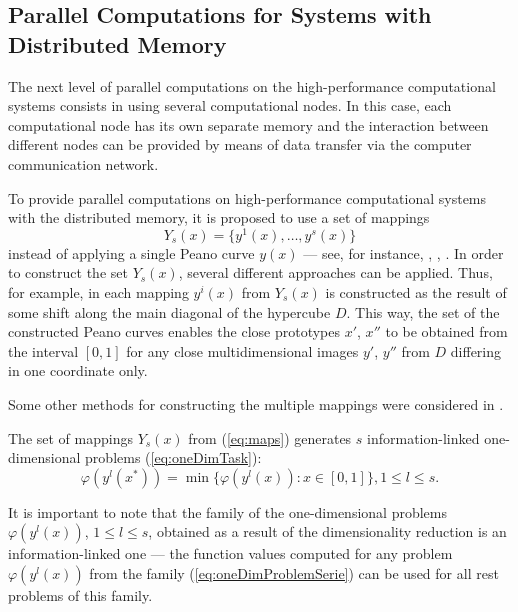 \documentclass{aims}
\theoremstyle{definition}
\begin{document}
\subsection{Parallel Computations for Systems with Distributed Memory}
\label{subsec:distribpar}
The next level of parallel computations on the high-performance computational systems
consists in using several computational nodes. In this case, each computational node has
its own separate memory and the interaction between different nodes can be provided by
means of data transfer via the computer communication network.
\par
To provide parallel computations on high-performance computational systems with the distributed memory, it is proposed to use a set of mappings
\begin{equation}
  \label{eq:maps}
Y_s(x)=\{y^1(x),\dots,y^s(x)\}
\end{equation}
instead of applying a single Peano curve \(y(x)\) --- see, for instance,
\cite{strongin1992}, \cite{stronginGergelBarkalovParGO}, \cite{strSergGO}.
In order to construct the set \(Y_s(x)\), several different approaches can be applied.
Thus, for example, in \cite{strongin1992} each mapping \(y^i(x)\) from \(Y_s(x)\) is constructed
as the result of some shift along the main diagonal of the hypercube \(D\). This way,
the set of the constructed Peano curves enables the close prototypes \(x'\), \(x''\)
to be obtained from the interval \([0, 1]\) for any close multidimensional images
\(y'\), \(y''\) from \(D\) differing in one coordinate only.
\par
Some other methods for constructing the multiple mappings were considered in \cite{stronginGergelBarkalovParGO}.
\par
The set of mappings \(Y_s(x)\) from (\ref{eq:maps}) generates \(s\) information-linked one-\linebreak
dimensional problems (\ref{eq:oneDimTask}):
\begin{equation}
  \label{eq:oneDimProblemSerie}
  \varphi(y^l(x^*))=\min\{\varphi(y^l(x)):x\in [0,1]\},1\leq l\leq s.
\end{equation}
\par
It is important to note that the family of the one-dimensional problems
$\varphi(y^l(x))$, $1 \leq l \leq s$, obtained as a result of the dimensionality
reduction is an information-linked one --- the function values computed for any
problem \(\varphi(y^l(x))\) from the family (\ref{eq:oneDimProblemSerie}) can be used for all rest problems of this family.
\par
\end{document}
